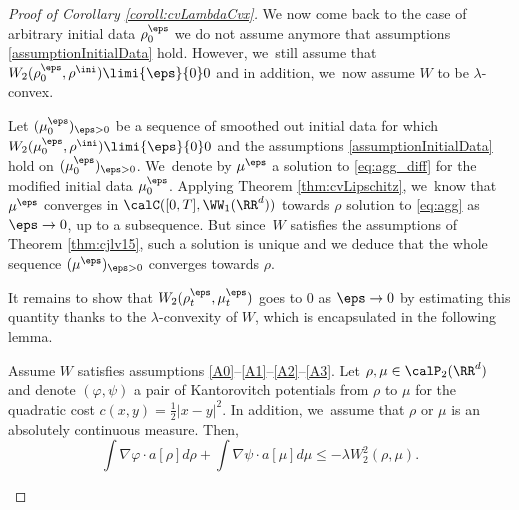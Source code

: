 \begin{proof}[Proof of Corollary \ref{coroll:cvLambdaCvx}]
We now come back to the case of arbitrary initial data $\rho_0^\eps$ \ie we do not assume anymore that assumptions \eqref{assumptionInitialData} hold. However, we~still assume that $W_2(\rho_0^\eps, \rho^{\ini}) \limi{\eps}{0} 0$ and in addition, we~now assume $W$ to be $\lambda$-convex.

Let $(\mu^\eps_0)_{\eps > 0}$ be a sequence of smoothed out initial data for which $W_2(\mu_0^\eps,\rho^{\ini}) \limi{\eps}{0} 0$ and the assumptions \eqref{assumptionInitialData} hold on $(\mu^\eps_0)_{\eps > 0}$. We~denote by $\mu^\eps$ a solution to \eqref{eq:agg_diff} for the modified initial data $\mu^\eps_0$. Applying Theorem \ref{thm:cvLipschitz}, we~know that $\mu^\eps$ converges in $\calC([0,T], \WW_1(\RR^d))$ towards $\rho$ solution to \eqref{eq:agg} as $\eps \to 0$, up to a subsequence. But since~$W$ satisfies the assumptions of Theorem \ref{thm:cjlv15}, such a solution is unique and we deduce that the whole sequence $(\mu^\eps)_{\eps>0}$ converges towards $\rho$.

It remains to show that $W_2(\rho^\eps_t, \mu^\eps_t)$ goes to 0 as $\eps \to 0$ by estimating this quantity thanks to the $\lambda$-convexity of $W$, which is encapsulated in the following lemma.
\begin{lemma}\label{lemma:contractionLambdaCvx}
Assume $W$ satisfies assumptions \eqref{A0}--\eqref{A1}--\eqref{A2}--\eqref{A3}. Let $\rho, \mu \in \calP_2(\RR^d)$ and denote $(\varphi, \psi)$ a pair of Kantorovitch potentials from $\rho$ to $\mu$ for the quadratic cost $c(x,y) = \frac 12 |x-y|^2$. In addition, we~assume that $\rho$ or $\mu$ is an absolutely continuous measure. Then,
\begin{equation*}%
\int \nabla \varphi \cdot a[\rho] d\rho + \int \nabla \psi \cdot a[\mu] d\mu \leq -\lambda W_2^2(\rho, \mu).
\end{equation*}
\end{lemma}


\end{proof}
